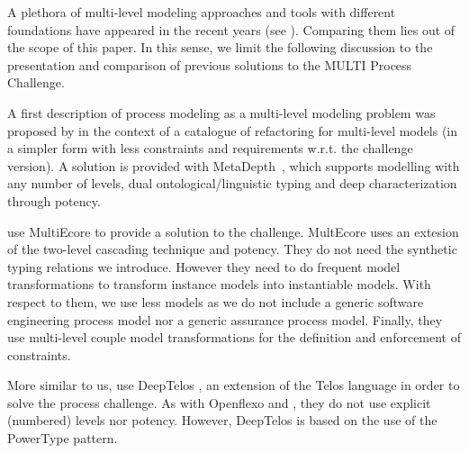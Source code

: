 
A plethora of multi-level modeling approaches and tools with different foundations have appeared in the recent years (see \cite{multiTools}). Comparing them lies out of the scope of this paper. In this sense, we limit the following discussion to the presentation and comparison of previous solutions to the MULTI Process Challenge.

A first description of process modeling as a multi-level modeling problem was proposed by \cite{lara2018refactoring} in the context of a catalogue of refactoring for multi-level models (in a simpler form with less constraints and requirements w.r.t. the challenge version). A solution is provided with MetaDepth~\citep{metadepth}, which supports modelling with any number of levels, dual ontological/linguistic typing and deep characterization through potency.

\cite{multiecore2019} use MultiEcore \citep{multecore2016} to provide a solution to the challenge. MultEcore uses an extesion of the two-level cascading technique and potency. They do not need the synthetic typing relations we introduce. However they need to do frequent model transformations to transform instance models into instantiable models. With respect to them, we use less models as we do not include a generic software engineering process model nor a generic assurance process model. Finally, they use multi-level couple model transformations for the definition and enforcement of constraints.

More similar to us, \cite{deeptelos2019} use DeepTelos \citep{deeptelos2016}, an extension of the Telos language \citep{telos1990} in order to solve the process challenge. As with Openflexo and \FML, they do not use explicit (numbered) levels nor potency. However, DeepTelos is based on the use of the PowerType \citep{atkinson2001essence} pattern.



